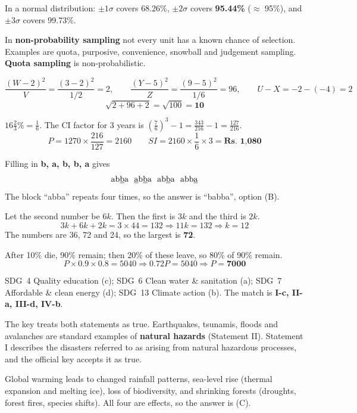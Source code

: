 In a normal distribution: $\pm1\sigma$ covers 68.26\%, $\pm2\sigma$ covers \textbf{95.44\%} ($\approx$ 95\%), and $\pm3\sigma$ covers 99.73\%.

In \textbf{non-probability sampling} not every unit has a known chance of selection. Examples are quota, purposive, convenience, snowball and judgement sampling. \textbf{Quota sampling} is non-probabilistic.

\[\frac{(W-2)^2}{V}=\frac{(3-2)^2}{1/2}=2,\qquad \frac{(Y-5)^2}{Z}=\frac{(9-5)^2}{1/6}=96,\qquad U-X=-2-(-4)=2\]
\[\sqrt{2+96+2}=\sqrt{100}=\mathbf{10}\]

$16\tfrac23\%=\tfrac16$. The CI factor for 3 years is $\left(\tfrac76\right)^3-1=\tfrac{343}{216}-1=\tfrac{127}{216}$.
\[P=1270\times\frac{216}{127}=2160\qquad SI=2160\times\frac16\times3=\textbf{Rs.\ 1{,}080}\]

Filling in \textbf{b, a, b, b, a} gives
\[\text{ab\underline{b}a}\ \ \text{\underline{a}b\underline{b}a}\ \ \text{ab\underline{b}a}\ \ \text{abb\underline{a}}\]
The block ``abba'' repeats four times, so the answer is ``babba'', option (B).

Let the second number be $6k$. Then the first is $3k$ and the third is $2k$.
\[3k+6k+2k=3\times44=132\Rightarrow 11k=132\Rightarrow k=12\]
The numbers are 36, 72 and 24, so the largest is \textbf{72}.

After 10\% die, 90\% remain; then 20\% of these leave, so 80\% of 90\% remain.
\[P\times0.9\times0.8=5040\Rightarrow 0.72P=5040\Rightarrow P=\mathbf{7000}\]

SDG~4 Quality education (c); SDG~6 Clean water \& sanitation (a); SDG~7 Affordable \& clean energy (d); SDG~13 Climate action (b). The match is \textbf{I-c, II-a, III-d, IV-b}.

The key treats both statements as true. Earthquakes, tsunamis, floods and avalanches are standard examples of \textbf{natural hazards} (Statement II). Statement I describes the disasters referred to as arising from natural hazardous processes, and the official key accepts it as true.

Global warming leads to changed rainfall patterns, sea-level rise (thermal expansion and melting ice), loss of biodiversity, and shrinking forests (droughts, forest fires, species shifts). All four are effects, so the answer is (C).

